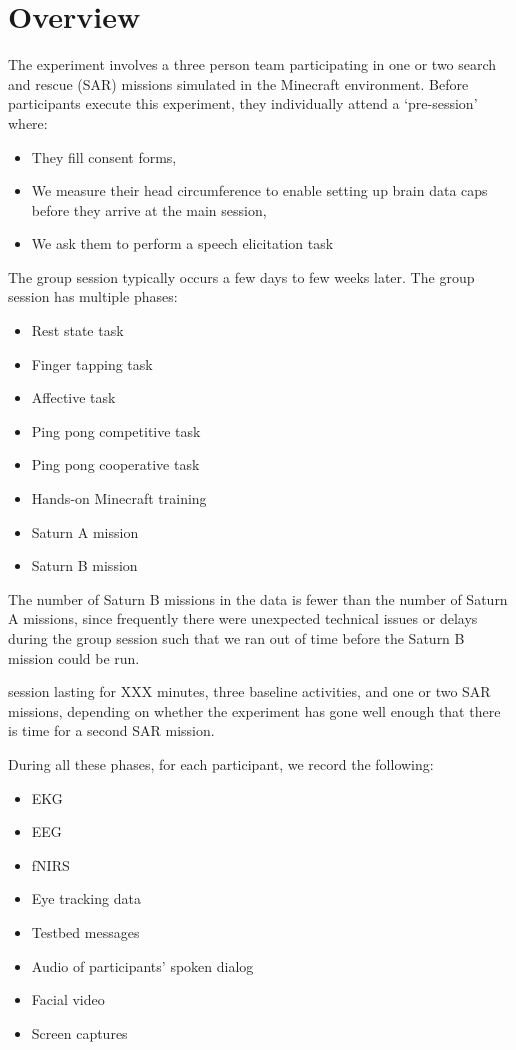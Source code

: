 \section{Overview}

The experiment involves a three person team participating in one or two
search and rescue (SAR) missions simulated in the Minecraft environment.
Before participants execute this experiment, they individually attend a
`pre-session' where:

\begin{itemize}
    \item They fill consent forms,
    \item We measure their head circumference to enable setting up brain data
        caps before they arrive at the main session,
    \item We ask them to perform a speech elicitation task
\end{itemize}
%
The group session typically occurs a few days to few weeks later.
The group session has multiple phases:

\begin{itemize}
    \item Rest state task
    \item Finger tapping task
    \item Affective task
    \item Ping pong competitive task
    \item Ping pong cooperative task
    \item Hands-on Minecraft training
    \item Saturn A mission
    \item Saturn B mission
\end{itemize}

The number of Saturn B missions in the data is fewer than the number of Saturn
A missions, since frequently there were unexpected technical issues or delays
during the group session such that we ran out of time before the Saturn B
mission could be run.

session lasting for XXX minutes, three baseline activities, and one or two SAR
missions, depending on whether the experiment has gone well enough that there is
time for a second SAR mission.

During all these phases, for each participant, we record the following:

\begin{itemize}
    \item EKG
    \item EEG
    \item fNIRS
    \item Eye tracking data
    \item Testbed messages
    \item Audio of participants' spoken dialog
    \item Facial video
    \item Screen captures
\end{itemize}
